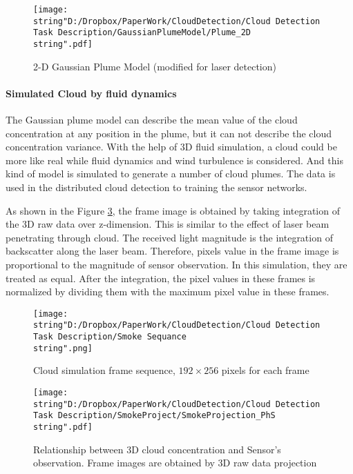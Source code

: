 \begin{figure}
\hfill{}\texttt{[image: \\string"D:/Dropbox/PaperWork/CloudDetection/Cloud Detection Task Description/GaussianPlumeModel/Plume\_2D\\string".pdf]}\hfill{}

\caption{\label{fig:2-D-Gaussian-Plume}2-D Gaussian Plume Model (modified
for laser detection)}
\end{figure}



\paragraph{Simulated Cloud by fluid dynamics}

The Gaussian plume model can describe the mean value of the cloud
concentration at any position in the plume, but it can not describe
the cloud concentration variance. With the help of 3D fluid simulation,
a cloud could be more like real while fluid dynamics and wind turbulence
is considered. And this kind of model is simulated to generate a number
of cloud plumes. The data is used in the distributed cloud detection
to training the sensor networks.

As shown in the Figure \ref{fig:Frame-projection}, the frame image
is obtained by taking integration of the 3D raw data over z-dimension.
This is similar to the effect of laser beam penetrating through cloud.
The received light magnitude is the integration of backscatter along
the laser beam. Therefore, pixels value in the frame image is proportional
to the magnitude of sensor observation. In this simulation, they are
treated as equal. After the integration, the pixel values in these
frames is normalized by dividing them with the maximum pixel value
in these frames.

\begin{figure}
\hfill{}\texttt{[image: \\string"D:/Dropbox/PaperWork/CloudDetection/Cloud Detection Task Description/Smoke Sequance\\string".png]}\hfill{}\hfill{}

\caption{\label{fig:Cloud-simulation-frame}Cloud simulation frame sequence,
$192\times256$ pixels for each frame}
\end{figure}


\begin{figure}
\hfill{}\texttt{[image: \\string"D:/Dropbox/PaperWork/CloudDetection/Cloud Detection Task Description/SmokeProject/SmokeProjection\_PhS\\string".pdf]}\hfill{}\hfill{}

\caption{\label{fig:Frame-projection}Relationship between 3D cloud concentration
and Sensor's observation. Frame images are obtained by 3D raw data
projection }
\end{figure}





